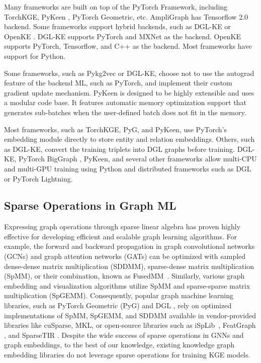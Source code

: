 Many frameworks are built on top of the PyTorch Framework, including TorchKGE, PyKeen \cite{ali2021pykeen}, PyTorch Geometric, etc. AmpliGraph \cite{ampligraph} has Tensorflow 2.0 backend. Some frameworks support hybrid backends, such as DGL-KE or OpenKE \cite{han2018openke}. DGL-KE supports PyTorch and MXNet as the backend. OpenKE supports PyTorch, Tensorflow, and C++ as the backend. Most frameworks have support for Python. 

Some frameworks, such as Pykg2vec \cite{yu2019pykg2vec} or DGL-KE, choose not to use the autograd feature of the backend ML, such as PyTorch, and implement their custom gradient update mechanism. PyKeen is designed to be highly extensible and uses a modular code base. It features automatic memory optimization support that generates sub-batches when the user-defined batch does not fit in the memory.

Most frameworks, such as TorchKGE, PyG, and PyKeen, use PyTorch's embedding module directly to store entity and relation embeddings.  Others, such as DGL-KE, convert the training triplets into DGL graphs before training. DGL-KE, PyTorch BigGraph \cite{lerer2019pytorch}, PyKeen, and several other frameworks allow multi-CPU and multi-GPU training using Python and distributed frameworks such as DGL or PyTorch Lightning.

\subsection{Sparse Operations in Graph ML} 
Expressing graph operations through sparse linear algebra has proven highly effective for developing efficient and scalable graph learning algorithms. 
For example, the forward and backward propagation in graph convolutional networks (GCNs) and graph attention networks (GATs) can be optimized with sampled dense-dense matrix multiplication (SDDMM), sparse-dense matrix multiplication (SpMM), or their combination, known as FusedMM~\cite{fey2019fast, wang2019deep, rahman2021fusedmm}. 
Similarly, various graph embedding and visualization algorithms utilize SpMM and sparse-sparse matrix multiplication (SpGEMM). 
Consequently, popular graph machine learning libraries, such as PyTorch Geometric (PyG) \cite{fey2019fast} and DGL \cite{wang2019deep}, rely on optimized implementations of SpMM, SpGEMM, and SDDMM available in vendor-provided libraries like cuSparse, MKL, or open-source libraries such as iSpLib~\cite{hoque2024isplib}, FeatGraph \cite{hu2020featgraph}, and SparseTIR \cite{ye2023sparsetir}.
Despite the wide success of sparse operations in GNNs and graph embeddings, to the best of our knowledge, existing knowledge graph embedding libraries do not leverage sparse operations for training KGE models.


